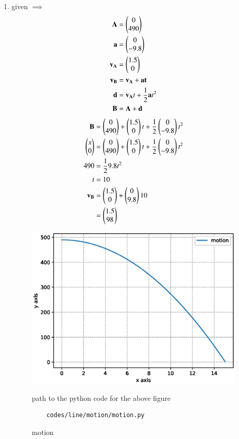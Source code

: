 \renewcommand{\theequation}{\theenumi}
\begin{enumerate}[label=\arabic*.,ref=\thesubsection.\theenumi]

\item given $\implies$
\\
\begin{align}
\mathbf {A}&= \begin{pmatrix}0\\490\end{pmatrix}
\\
\mathbf {a} &= \begin{pmatrix}0\\-9.8\end{pmatrix}
\\
\mathbf {v_A} &= \begin{pmatrix}1.5\\0\end{pmatrix}
\\
\mathbf {v_B} &=  \mathbf {v_A}  + \mathbf {a t}
\\
\mathbf {d} &= \mathbf {v_A}t + \frac{1}{2}\mathbf {a} t^2
\\
\mathbf {B} &= \mathbf {A} + \mathbf{ d}
\end{align}
\begin{align}
\mathbf {B} &= \begin{pmatrix}0\\490\end{pmatrix} + \begin{pmatrix}1.5\\0\end{pmatrix}t +\frac{1}{2}\begin{pmatrix}0\\-9.8\end{pmatrix} t^2
\\
\begin{pmatrix}x\\0\end{pmatrix} &= \begin{pmatrix}0\\490\end{pmatrix} + \begin{pmatrix}1.5\\0\end{pmatrix}t +\frac{1}{2}\begin{pmatrix}0\\-9.8\end{pmatrix} t^2
\\
490 &= \frac{1}{2} 9.8t^2
\\
t &= 10
\\
\mathbf {v_B} &= \begin{pmatrix}1.5\\0\end{pmatrix} + \begin{pmatrix}0\\9.8\end{pmatrix}10 
\\&= \begin{pmatrix}1.5\\98\end{pmatrix}
\end{align}
\begin{figure}[!ht]
	\centering
	\includegraphics[width=\columnwidth]{./figures/line/motion/motion.eps}
	\caption{motion }
	\label{fig:motion}
	path to the python code for the above figure
	\begin{lstlisting}
	codes/line/motion/motion.py
	\end{lstlisting} 
\end{figure}


\end{enumerate}